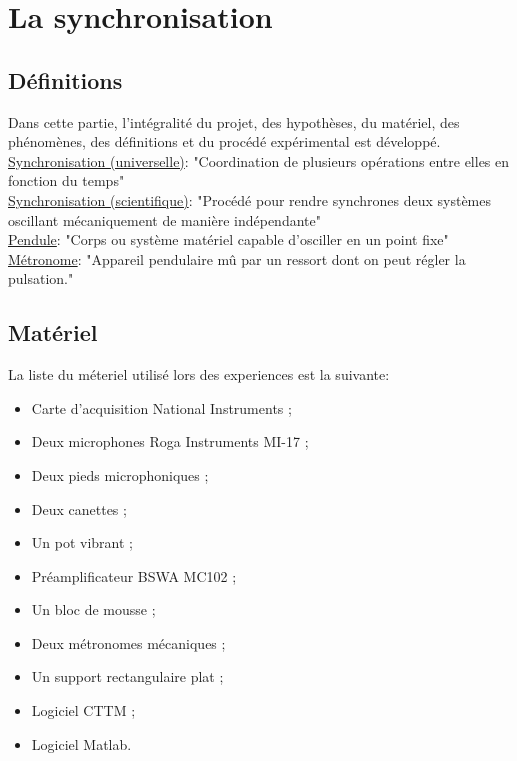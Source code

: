 \documentclass[a4paper,11pt]{report}
\begin{document}
\newpage
\null
\thispagestyle{empty}
\chapter{La synchronisation}
\section{Définitions}
Dans cette partie, l'intégralité du projet, des hypothèses, du matériel, des phénomènes, des définitions et du procédé expérimental est développé.\\
\underline{Synchronisation (universelle)}: "Coordination de plusieurs opérations entre elles en fonction du temps"\cite{wiki}\\
\underline{Synchronisation (scientifique)}: "Procédé pour rendre synchrones deux systèmes oscillant mécaniquement de manière indépendante"\cite{cntrl}\\
\underline{Pendule}: "Corps ou système matériel capable d'osciller en un point fixe"\cite{ikonet}\\
\underline{Métronome}: "Appareil pendulaire mû par un ressort dont on peut régler la pulsation."\cite{pend} \\

\section{Matériel}

La liste du méteriel utilisé lors des experiences est la suivante:\\
\begin{itemize}[label=\textbullet, leftmargin=* ,parsep=0cm,itemsep=0cm,topsep=0cm,font=\tiny]
\item Carte d'acquisition National Instruments ;
\item Deux microphones Roga Instruments MI-17 ;
\item Deux pieds microphoniques ;
\item Deux canettes ;
\item Un pot vibrant ;
\item Préamplificateur BSWA MC102 ;
\item  Un bloc de mousse ;
\item Deux métronomes mécaniques ;
\item Un support rectangulaire plat ;
\item Logiciel CTTM ;
\item Logiciel Matlab.
\end{itemize}
\end{document}
